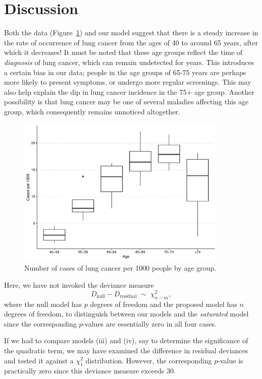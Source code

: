 \documentclass[10pt]{article}
\begin{document}
    \section{Discussion}

    Both the data (Figure~\ref{fig:danishlc_box}) and our model suggest that there is
    a steady increase in the rate of occurrence of lung cancer from the ages of 40 to
    around 65 years, after which it decreases! It must be noted that these age groups
    reflect the time of \emph{diagnosis} of lung cancer, which can remain undetected
    for years. This introduces a certain bias in our data; people in the age groups
    of 65-75 years are perhaps more likely to present symptoms, or undergo more
    regular screenings. This may also help explain the dip in lung cancer incidence
    in the 75+ age group. Another possibility is that lung cancer may be one of
    several maladies affecting this age group, which consequently remains unnoticed
    altogether.


    \begin{figure}[H]
    \begin{center}
        \vspace{1em}
        \includegraphics[width=0.9\textwidth]{plot_07.pdf}
    \end{center}
    \caption{
        Number of cases of lung cancer per 1000 people by age group.
    }
    \label{fig:danishlc_box}
    \end{figure}

    Here, we have not invoked the deviance measure \[
        D_{\text{null}} - D_{\text{residual}} \;\sim\; \chi_{n - m}^2,
    \] where the null model has $p$ degrees of freedom and the proposed model has $n$
    degrees of freedom, to distinguish between our models and the \emph{saturated}
    model since the corresponding $p$-values are essentially zero in all four cases.

    If we had to compare models (iii) and (iv), say to determine the significance of
    the quadratic term, we may have examined the difference in residual deviances and
    tested it against a $\chi_1^2$ distribution. However, the corresponding $p$-value
    is practically zero since this deviance measure exceeds 30.
\end{document}
